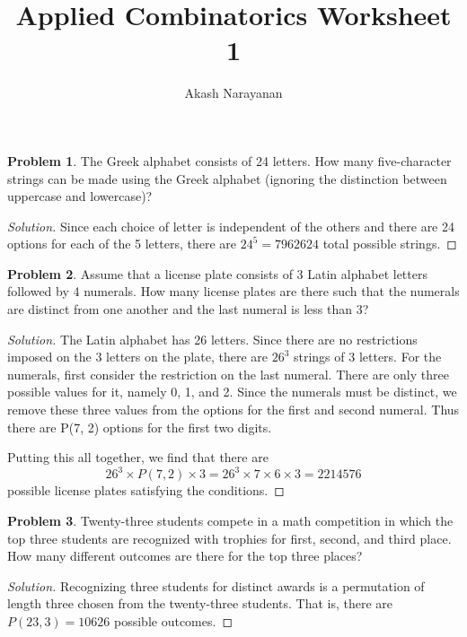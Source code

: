 \documentclass[12pt]{article}
\title{Applied Combinatorics Worksheet 1}
\author{Akash Narayanan}
\theoremstyle{definition}
\newtheorem{problem-internal}{Problem}[]
\newenvironment{problem}{
  \medskip
  \begin{problem-internal}
}{
\end{problem-internal}
}
\newenvironment{solution}{
  \begin{proof}[Solution]
    \vspace{-8px}
    \setlength{\parskip}{4px}
    \setlength{\parindent}{0px}
}{
\end{proof}
}
\begin{document}
  \maketitle

  \begin{problem}
    The Greek alphabet consists of 24 letters. How many five-character strings can be made using the Greek alphabet (ignoring the distinction between uppercase and lowercase)?
  \end{problem}
  \begin{solution}
    Since each choice of letter is independent of the others and there are 24 options for each of the 5 letters, there are $24^5 = 7962624$ total possible strings.
  \end{solution}

  \begin{problem}
    Assume that a license plate consists of 3 Latin alphabet letters followed by 4 numerals. How many license plates are there such that the numerals are distinct from one another and the last numeral is less than 3?
  \end{problem}
  \begin{solution}
    The Latin alphabet has 26 letters. Since there are no restrictions imposed on the 3 letters on the plate, there are $26^3$ strings of 3 letters. For the numerals, first consider the restriction on the last numeral. There are only three possible values for it, namely 0, 1, and 2. Since the numerals must be distinct, we remove these three values from the options for the first and second numeral. Thus there are P(7, 2) options for the first two digits.

    Putting this all together, we find that there are
    \[ 26^3 \times P(7, 2) \times 3 = 26^3 \times 7 \times 6 \times 3 = 2214576 \]
    possible license plates satisfying the conditions.
  \end{solution}

  \begin{problem}
    Twenty-three students compete in a math competition in which the top three students are recognized with trophies for first, second, and third place. How many different outcomes are there for the top three places?
  \end{problem}
  \begin{solution}
    Recognizing three students for distinct awards is a permutation of length three chosen from the twenty-three students. That is, there are $P(23, 3) = 10626$ possible outcomes.
  \end{solution}
\end{document}

